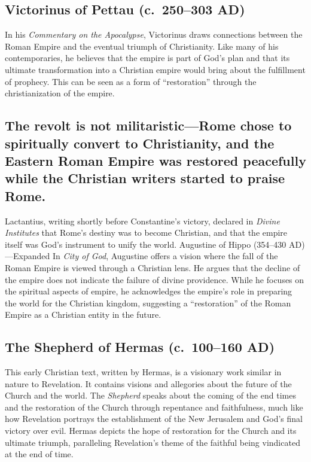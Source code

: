 \subsection{Victorinus of Pettau (c.~250--303 AD)}\label{par:victorinus-of-pettau-c.-250303-ad}

In his \emph{Commentary on the Apocalypse}, Victorinus draws connections between the Roman Empire and the eventual triumph of Christianity.
Like many of his contemporaries, he believes that the empire is part of God's plan and that its ultimate transformation into a Christian empire would bring about the fulfillment of prophecy.
This can be seen as a form of ``restoration'' through the christianization of the empire.

\subsection{The revolt is not militaristic---Rome chose to spiritually convert to Christianity, and the Eastern Roman Empire was restored peacefully while the Christian writers started to praise Rome.}\label{par:the-revolt-is-not-militaristic-rome-chose-to-spiritually-convert-to-christianity-and-the-eastern-roman-empire-was-restored-peacefully-while-the-christian-writers-started-to-praise-rome.}

Lactantius, writing shortly before Constantine’s victory, declared in \emph{Divine Institutes} that Rome’s destiny was to become Christian, and that the empire itself was God’s instrument to unify the world.
Augustine of Hippo (354--430 AD)---Expanded In \emph{City of God}, Augustine offers a vision where the fall of the Roman Empire is viewed through a Christian lens.
He argues that the decline of the empire does not indicate the failure of divine providence.
While he focuses on the spiritual aspects of empire, he acknowledges the empire's role in preparing the world for the Christian kingdom, suggesting a ``restoration'' of the Roman Empire as a Christian entity in the future.

\subsection{The Shepherd of Hermas (c.~100--160 AD)}\label{par:the-shepherd-of-hermas-c.-100-160-ad}

This early Christian text, written by Hermas, is a visionary work similar in nature to Revelation.
It contains visions and allegories about the future of the Church and the world.
The \emph{Shepherd} speaks about the coming of the end times and the restoration of the Church through repentance and faithfulness, much like how Revelation portrays the establishment of the New Jerusalem and God's final victory over evil.
Hermas depicts the hope of restoration for the Church and its ultimate triumph, paralleling Revelation's theme of the faithful being vindicated at the end of time.

